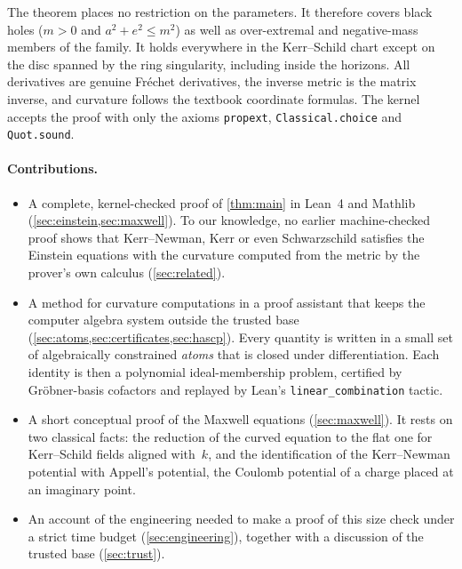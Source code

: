 \documentclass[11pt]{article}
\theoremstyle{definition}
\theoremstyle{remark}
\newcommand{\lean}[1]{\lstinline[basicstyle=\ttfamily\normalsize,columns=fullflexible,breaklines=false]{#1}}
\begin{document}
The theorem places no restriction on the parameters.
It therefore covers black holes ($m>0$ and $a^2+e^2\le m^2$) as well as over-extremal and negative-mass members of the family.
It holds everywhere in the Kerr--Schild chart except on the disc spanned by the ring singularity, including inside the horizons.
All derivatives are genuine Fr\'echet derivatives, the inverse metric is the matrix inverse, and curvature follows the textbook coordinate formulas.
The kernel accepts the proof with only the axioms \lean{propext}, \lean{Classical.choice} and \lean{Quot.sound}.

\paragraph{Contributions.}
\begin{itemize}
  \item A complete, kernel-checked proof of \cref{thm:main} in Lean~4 and Mathlib~\cite{mathlib2020} (\cref{sec:einstein,sec:maxwell}).
  To our knowledge, no earlier machine-checked proof shows that Kerr--Newman, Kerr or even Schwarzschild satisfies the Einstein equations with the curvature computed from the metric by the prover's own calculus (\cref{sec:related}).
  \item A method for curvature computations in a proof assistant that keeps the computer algebra system outside the trusted base (\cref{sec:atoms,sec:certificates,sec:hascp}).
  Every quantity is written in a small set of algebraically constrained \emph{atoms} that is closed under differentiation.
  Each identity is then a polynomial ideal-membership problem, certified by Gr\"obner-basis cofactors and replayed by Lean's \lean{linear_combination} tactic.
  \item A short conceptual proof of the Maxwell equations (\cref{sec:maxwell}).
  It rests on two classical facts: the reduction of the curved equation to the flat one for Kerr--Schild fields aligned with~$k$, and the identification of the Kerr--Newman potential with Appell's potential, the Coulomb potential of a charge placed at an imaginary point.
  \item An account of the engineering needed to make a proof of this size check under a strict time budget (\cref{sec:engineering}), together with a discussion of the trusted base (\cref{sec:trust}).
\end{itemize}
\end{document}

